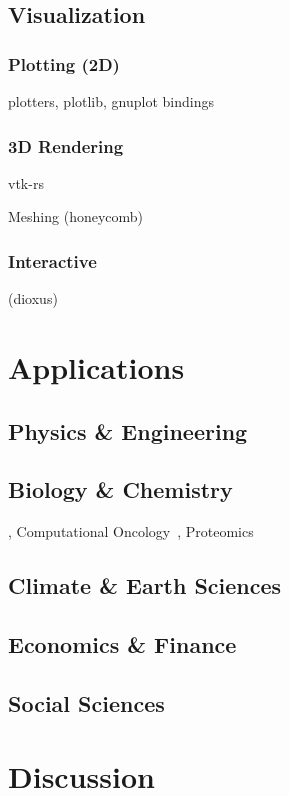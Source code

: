 \documentclass{article}
\begin{document}
\subsection{Visualization}
\subsubsection{Plotting (2D)}
plotters, plotlib, gnuplot bindings

\subsubsection{3D Rendering}
vtk-rs

Meshing (honeycomb)

\subsubsection{Interactive}
(dioxus)

\section{Applications}
\label{section:applications}

\subsection{Physics \& Engineering}
\subsection{Biology \& Chemistry}
\cite{Pleyer2024}, Computational Oncology~\cite{Köster2025}, Proteomics~\cite{Anechitoaie2024}
\subsection{Climate \& Earth Sciences}
\subsection{Economics \& Finance}
\subsection{Social Sciences}

\section{Discussion}
\label{section:discussion}
\end{document}
